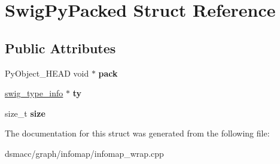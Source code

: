 \hypertarget{structSwigPyPacked}{}\section{Swig\+Py\+Packed Struct Reference}
\label{structSwigPyPacked}
\subsection*{Public Attributes}
\begin{DoxyCompactItemize}
\item 
\mbox{\label{structSwigPyPacked_af5122bcb9e73bf2dec4ce5f58f004e1b}} 
Py\+Object\+\_\+\+H\+E\+AD void $\ast$ {\bfseries pack}
\item 
\mbox{\label{structSwigPyPacked_aa6f6be0a8a1bff7710200fbe8d51acf0}} 
\mbox{\hyperlink{structswig__type__info}{swig\+\_\+type\+\_\+info}} $\ast$ {\bfseries ty}
\item 
\mbox{\label{structSwigPyPacked_aed2bfb8fb3c9f804c386215db63921cb}} 
size\+\_\+t {\bfseries size}
\end{DoxyCompactItemize}


The documentation for this struct was generated from the following file\+:\begin{DoxyCompactItemize}
\item 
dsmacc/graph/infomap/infomap\+\_\+wrap.\+cpp\end{DoxyCompactItemize}
